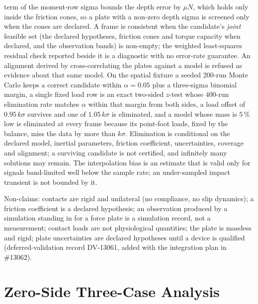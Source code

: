 \documentclass[11pt,a4paper]{article}
\begin{document}
term of the moment-row sigma bounds the depth error by $\mu N$, which holds
only inside the friction cones, so a plate with a non-zero depth sigma is
screened only when the cones are declared.  A frame is consistent when the candidate's
\emph{joint} feasible set (the declared hypotheses, friction cones and torque
capacity when declared, and the observation bands) is non-empty; the
weighted least-squares residual check reported beside it is a diagnostic with
no error-rate guarantee.  An alignment derived by cross-correlating the plates against a model is
refused as evidence about that same model.  On the spatial fixture a seeded
200-run Monte Carlo keeps a correct candidate within $\alpha=0.05$ plus a
three-sigma binomial margin, a single fixed load row is an exact two-sided
$z$-test whose 400-run elimination rate matches $\alpha$ within that margin
from both sides, a load offset of $0.95\,k\sigma$ survives and one of
$1.05\,k\sigma$ is eliminated, and a model whose mass is $5\,\%$ low is
eliminated at every frame because its point-foot loads, fixed by the balance,
miss the data by more than $k\sigma$.  Elimination is conditional on the
declared model, inertial parameters, friction coefficient, uncertainties,
coverage and alignment; a surviving candidate is not certified, and
infinitely many solutions may remain.  The interpolation bias is an estimate
that is valid only for signals band-limited well below the sample rate; an
under-sampled impact transient is not bounded by it.

Non-claims: contacts are rigid and unilateral (no compliance, no slip
dynamics); a friction coefficient is a declared hypothesis; an observation
produced by a simulation standing in for a force plate is a simulation record,
not a measurement; contact loads are not physiological quantities; the plate
is massless and rigid; plate uncertainties are declared hypotheses until a
device is qualified (deferred-validation record DV-13061, added with the
integration plan in \#13062).

\section{Zero-Side Three-Case Analysis}
\label{sec:zeroside}
\end{document}
